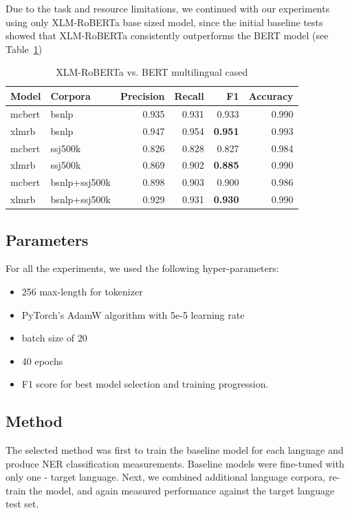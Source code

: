 \documentclass[sigconf]{acmart}
\begin{document}
Due to the task and resource limitations, we continued with our experiments using only XLM-RoBERTa base sized model,
since the initial baseline tests showed that XLM-RoBERTa consistently outperforms the BERT model (see Table~\ref{tab:roberta_vs_bert})

\begin{table}[H]
  \caption{XLM-RoBERTa vs. BERT multilingual cased}
  \label{tab:roberta_vs_bert}
  \begin{tabular}{llrrrr}
    \toprule
    Model&Corpora&Precision&Recall&F1&Accuracy\\
    \midrule
    mcbert&bsnlp&0.935&0.931&0.933&0.990\\
    xlmrb&bsnlp&0.947&0.954&\textbf{0.951}&0.993\\
    \midrule
    mcbert&ssj500k&0.826&0.828&0.827&0.984\\
    xlmrb&ssj500k&0.869&0.902&\textbf{0.885}&0.990\\
    \midrule
    mcbert&bsnlp+ssj500k&0.898&0.903&0.900&0.986\\
    xlmrb&bsnlp+ssj500k&0.929&0.931&\textbf{0.930}&0.990\\
    \bottomrule
  \end{tabular}
\end{table}

\subsection{Parameters}
\label{subsec:parameters}
For all the experiments, we used the following hyper-parameters:
\begin{itemize}
  \item 256 max-length for tokenizer
  \item PyTorch's AdamW algorithm with 5e-5 learning rate
  \item batch size of 20
  \item 40 epochs
  \item F1 score for best model selection and training progression.
\end{itemize}

\subsection{Method}
\label{subsec:method}
The selected method was first to train the baseline model for each language and produce NER classification measurements.
Baseline models were fine-tuned with only one - target language.
Next, we combined additional language corpora, re-train the model, and again measured performance against the target language test set.
\end{document}
